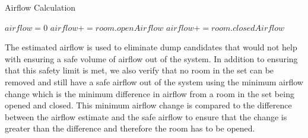 \begin{algorithm}                      %
\caption{Airflow Calculation}          %
\label{alg:calculateAirflow}%
\begin{algorithmic}                    %
\STATE $airflow = 0$
\STATE $airflow += room.openAirflow$
\ELSE
\STATE $airflow += room.closedAirflow$
\ENDIF
\ENDFOR
\end{algorithmic}
\end{algorithm}

The estimated airflow is used to eliminate dump candidates that would not help
with ensuring a safe volume of airflow out of the system. In addition to
ensuring that this safety limit is met, we also verify that no room in the set
can be removed and still have a safe airflow out of the system using the minimum
airflow change which is the minimum difference in airflow from a room in the set
being opened and closed. This minimum airflow change is compared to the
difference between the airflow estimate and the safe airflow to ensure that the
change is greater than the difference and therefore the room has to be opened. 

